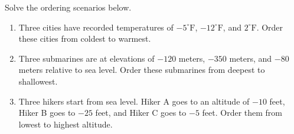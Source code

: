 \documentclass[12pt, letterpaper, fleqn]{article}
\begin{document}
\noindent
Solve the ordering scenarios below.

\vspace{3mm}

\begin{enumerate}[itemsep=2.2cm, leftmargin=0.6cm]

\item Three cities have recorded temperatures of $-5^\circ\text{F}$, $-12^\circ\text{F}$, and $2^\circ\text{F}$. Order these cities from coldest to warmest.

\vspace{2.2cm}

\item Three submarines are at elevations of $-120$ meters, $-350$ meters, and $-80$ meters relative to sea level. Order these submarines from deepest to shallowest.

\vspace{2.2cm}

\item Three hikers start from sea level. Hiker A goes to an altitude of $-10$ feet, Hiker B goes to $-25$ feet, and Hiker C goes to $-5$ feet. Order them from lowest to highest altitude.

\vspace{2.2cm}

\end{enumerate}
\end{document}
